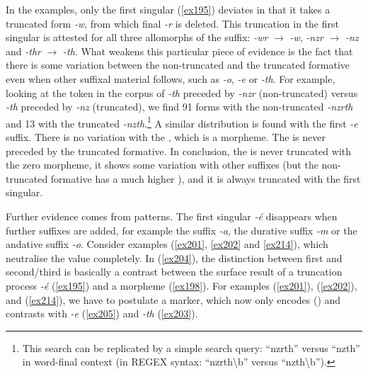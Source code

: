 In the examples, only the first singular (\ref{ex195}) deviates in that it takes a truncated form \emph{-w}, from which final \emph{-r} is deleted. This truncation in the first singular is attested for all three allomorphs of the  suffix: \emph{-wr} $\rightarrow$ \emph{-w}, \emph{-nzr} $\rightarrow$ \emph{-nz} and \emph{-thr} $\rightarrow$ \emph{-th}. What weakens this particular piece of evidence is the fact that there is some variation between the non-truncated and the truncated formative even when other suffixal material follows, such as \Andat{} \emph{-o}, {\Fnsg} \emph{-e} or \Stnsg{} \emph{-th}. For example, looking at the token  in the corpus of \Stnsg{} \emph{-th} preceded by \emph{-nzr} (non-truncated) versus \emph{-th} preceded by \emph{-nz} (truncated), we find 91  forms with the non-truncated  \emph{-nzrth} and 13 with the truncated  \emph{-nzth}.\footnote{This search can be replicated by a simple search query: ``nzrth'' versus ``nzth'' in word-final context (in \textsc{REGEX} syntax: ``nzrth\textbackslash b'' versus ``nzth\textbackslash b'').} A similar distribution is found with the first  \emph{-e} suffix. There is no variation with the \Stsg{}, which is a  morpheme. The \Stsg{} is never preceded by the truncated formative. In conclusion, the  is never truncated with the \Stsg{} zero morpheme, it shows some variation with other suffixes (but the non-truncated formative has a much higher ), and it is always truncated with the first singular.

Further evidence comes from   patterns. The first singular \emph{-é} disappears when further suffixes are added, for example the  suffix \emph{-a}, the durative suffix \emph{-m} or the andative suffix \emph{-o}. Consider examples (\ref{ex201}, \ref{ex202} and \ref{ex214}), which neutralise the  value completely. In (\ref{ex204}), the distinction between first and second/third  is basically a contrast between the surface result of a truncation process \emph{-é} (\ref{ex195}) and a  morpheme (\ref{ex198}). For examples (\ref{ex201}), (\ref{ex202}), and (\ref{ex214}), we have to postulate a  marker, which now only encodes  (\Sg) and contrasts with {\Fnsg} \emph{-e} (\ref{ex205}) and \Stnsg{} \emph{-th} (\ref{ex203}).

